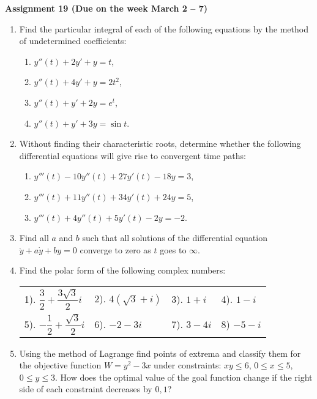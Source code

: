 \documentclass{article}
\begin{document}
\fontsize{14}{21}
\selectfont
\centerline{\textbf{Assignment 19 (Due on the week March 2 -- 7)}}
\fontsize{12}{18}
\selectfont
\begin{enumerate}
\item Find the particular integral of each of the following equations by the method of undetermined coefficients:

\begin{enumerate}
\item $y''(t)+2y'+y=t$,
\item $y''(t)+4y'+y=2t^2$,
\item $y''(t)+y'+2y=e^t$,
\item $y''(t)+y'+3y=\sin t$.
\end{enumerate}

\item Without finding their characteristic roots, determine whether the following differential equations will give rise to convergent time paths:
\begin{enumerate}
\item $y'''(t)-10y''(t)+27 y'(t)-18y=3$,
\item $y'''(t)+11y''(t)+34 y'(t)+24 y=5$,
\item $y'''(t)+4y''(t)+5y'(t)-2y=-2$.
\end{enumerate}

\item Find all $a$ and $b$ such that all solutions of the differential equation $\ddot{y}+a\dot{y}+by=0$ converge to zero as $t$ goes to $\infty$.

\item Find the polar form of the following complex numbers:

\begin{tabular}{llll}
1). $\dfrac32+\dfrac{3\sqrt{3}}2i$ & 2). $4(\sqrt{3}+i)$ & 3). $1+i$ & 4). $1-i$\\
5). $-\dfrac12+\dfrac {\sqrt{3}}2i$ & 6). $-2-3i$ & 7). $3-4i$ & 8) $-5-i$\\
\end{tabular}

\item Using the method of Lagrange find points of extrema and classify them for the objective function $W=y^2-3x$ under constraints: $xy\leqslant 6$, $0\leqslant x\leqslant 5$, $0\leqslant y\leqslant 3$. How does the optimal value of the goal function change if the right side of each constraint decreases by $0,1$?
\end{enumerate}
\end{document}
